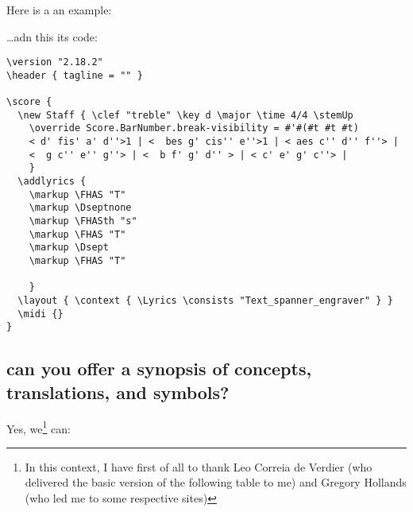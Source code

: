 \documentclass[
  DIV=calc,
  BCOR=5mm,
  12pt,
  headings=small,
  oneside,
  abstract=true,
  toc=bib,
  xcolor=dvipsnames,
  openany,
  ngerman,english]{scrartcl}
\begin{document}
Here is a an example:

\begin{center}
\end{center}

\ldots adn this its code:
\begin{scriptsize}
\begin{verbatim}
\version "2.18.2"
\header { tagline = "" }

\score {
  \new Staff { \clef "treble" \key d \major \time 4/4 \stemUp 
    \override Score.BarNumber.break-visibility = #'#(#t #t #t)
    < d' fis' a' d''>1 | <  bes g' cis'' e''>1 | < aes c'' d'' f''> | 
    <  g c'' e'' g''> | <  b f' g' d'' > | < c' e' g' c''> | 
    }
  \addlyrics { 
    \markup \FHAS "T" 
    \markup \Dseptnone   
    \markup \FHASth "s" 
    \markup \FHAS "T"
    \markup \Dsept
    \markup \FHAS "T"

    }
  \layout { \context { \Lyrics \consists "Text_spanner_engraver" } }
  \midi {}
}
\end{verbatim}
\end{scriptsize}
\subsection{can you offer a synopsis of concepts, translations, and symbols?}

Yes, we\footnote{In this context, I have first of all to thank Leo Correia de
Verdier (who delivered the basic version of the following table to me) and
Gregory Hollands (who led me to some respective sites)} can:
\end{document}
